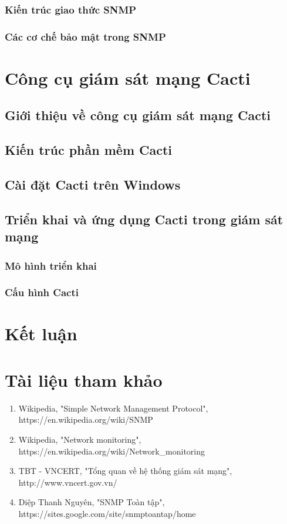 \documentclass[12pt,oneside,a4paper]{article}
\begin{document}
\subsubsection{Kiến trúc giao thức SNMP}
\subsubsection{Các cơ chế bảo mật trong SNMP}

\section{Công cụ giám sát mạng Cacti}
\subsection{Giới thiệu về công cụ giám sát mạng Cacti}
\subsection{Kiến trúc phần mềm Cacti}
\subsection{Cài đặt Cacti trên Windows}
\subsection{Triển khai và ứng dụng Cacti trong giám sát mạng}
\subsubsection{Mô hình triển khai}
\subsubsection{Cấu hình Cacti}

\section*{Kết luận}
%

\newpage
\section*{Tài liệu tham khảo}
%
%
\begin{enumerate}
\item{Wikipedia, "Simple Network Management Protocol", https://en.wikipedia.org/wiki/SNMP}
\item{Wikipedia, "Network monitoring", https://en.wikipedia.org/wiki/Network\_monitoring}
\item{TBT - VNCERT, "Tổng quan về hệ thống giám sát mạng", http://www.vncert.gov.vn/}
\item{Diệp Thanh Nguyên, "SNMP Toàn tập", https://sites.google.com/site/snmptoantap/home}
\end{enumerate}
	
\end{document}
